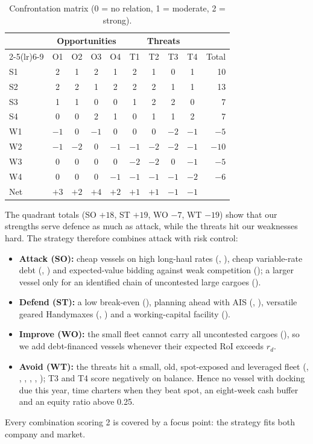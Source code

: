 \begin{table}[tbp]
  \medskip
  \caption{Confrontation matrix (0 = no relation, 1 = moderate, 2 = strong).}
  \label{tab:confrontation}
  \begin{tabular}{@{}l*{8}{c}r@{}}
    \toprule
        & \multicolumn{4}{c}{Opportunities} & \multicolumn{4}{c}{Threats} & \\
    \cmidrule(lr){2-5}\cmidrule(lr){6-9}
        & O1 & O2 & O3 & O4 & T1 & T2 & T3 & T4 & Total \\
    \midrule
    S1  & 2 & 1 & 2 & 1 & 2 & 1 & 0 & 1 & 10 \\
    S2  & 2 & 2 & 1 & 2 & 2 & 2 & 1 & 1 & 13 \\
    S3  & 1 & 1 & 0 & 0 & 1 & 2 & 2 & 0 & 7 \\
    S4  & 0 & 0 & 2 & 1 & 0 & 1 & 1 & 2 & 7 \\
    \midrule
    W1  & $-1$ & 0 & $-1$ & 0 & 0 & 0 & $-2$ & $-1$ & $-5$ \\
    W2  & $-1$ & $-2$ & 0 & $-1$ & $-1$ & $-2$ & $-2$ & $-1$ & $-10$ \\
    W3  & 0 & 0 & 0 & 0 & $-2$ & $-2$ & 0 & $-1$ & $-5$ \\
    W4  & 0 & 0 & 0 & $-1$ & $-1$ & $-1$ & $-1$ & $-2$ & $-6$ \\
    \midrule
    Net & $+3$ & $+2$ & $+4$ & $+2$ & $+1$ & $+1$ & $-1$ & $-1$ & \\
    \bottomrule
  \end{tabular}
\end{table}

The quadrant totals (SO $+18$, ST $+19$, WO $-7$, WT $-19$) show that our strengths serve defence as much as attack, while the threats hit our weaknesses hard. The strategy therefore combines attack with risk control:
\begin{itemize}
  \item \textbf{Attack (SO):} cheap vessels on high long-haul rates (, ), cheap variable-rate debt (, ) and expected-value bidding against weak competition (); a larger vessel only for an identified chain of uncontested large cargoes ().
  \item \textbf{Defend (ST):} a low break-even (), planning ahead with AIS (, ), versatile geared Handymaxes (, ) and a working-capital facility ().
  \item \textbf{Improve (WO):} the small fleet cannot carry all uncontested cargoes (), so we add debt-financed vessels whenever their expected RoI exceeds $r_d$.
  \item \textbf{Avoid (WT):} the threats hit a small, old, spot-exposed and leveraged fleet (, , , , , ); T3 and T4 score negatively on balance. Hence no vessel with docking due this year, time charters when they beat spot, an eight-week cash buffer and an equity ratio above 0.25.
\end{itemize}
Every combination scoring 2 is covered by a focus point: the strategy fits both company and market.
